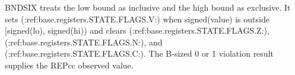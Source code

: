 BNDSIX treats the low bound as inclusive and the high bound as exclusive. It sets (:ref:base.registers.STATE.FLAGS.V:) when signed(value) is outside [signed(lo), signed(hi)) and clears (:ref:base.registers.STATE.FLAGS.Z:), (:ref:base.registers.STATE.FLAGS.N:), and (:ref:base.registers.STATE.FLAGS.C:). The B-sized 0 or 1 violation result supplies the REPcc observed value.
